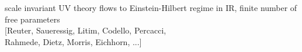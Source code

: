 \documentclass[]{beamer}  %
\begin{document}
\begin{frame}
\begin{columns}[T]
\begin{column}{.6\textwidth}
\begin{center}
        \vspace{15pt}
        scale invariant UV theory flows to Einstein-Hilbert regime in IR,
        finite number of free parameters\\[5pt]
        \hfill [Reuter, Saueressig, Litim, Codello, Percacci,\\
        \hfill Rahmede, Dietz, Morris, Eichhorn, ...]
      \end{center}
    \end{column}
  \end{columns}

\end{frame}


\end{document}

